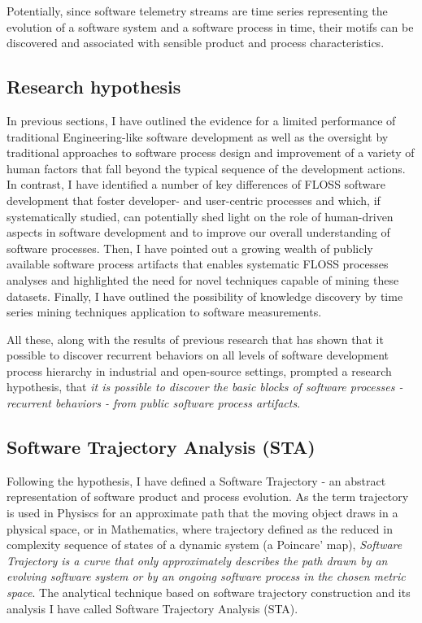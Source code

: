 Potentially, since software telemetry streams are time series representing the evolution of a software system 
and a software process in time, their motifs can be discovered and associated with sensible product and process characteristics.

%
%
\subsection{Research hypothesis}\label{section_research_hypothesis}
In previous sections, I have outlined the evidence for a limited performance of traditional Engineering-like 
software development as well as the oversight by traditional approaches to software process design and improvement
of a variety of human factors that fall beyond the typical sequence of the development actions.
In contrast, I have identified a number of key differences of FLOSS software development that 
foster developer- and user-centric processes and which, if systematically studied, can potentially shed light on 
the role of human-driven aspects in software development and to improve our overall understanding of 
software processes. 
Then, I have pointed out a growing wealth of publicly available software process artifacts that enables 
systematic FLOSS processes analyses and highlighted the need for novel techniques capable of mining these datasets.
Finally, I have outlined the possibility of knowledge discovery by time series mining techniques application 
to software measurements.

All these, along with the results of previous research that has shown that it possible to discover 
recurrent behaviors on all levels of software development process hierarchy \cite{citeulike:8347315} 
in industrial \cite{citeulike:5090131} and open-source \cite{citeulike:10377345} settings, 
prompted a research hypothesis, that \textit{it is possible to discover the basic blocks of software 
processes - recurrent behaviors - from public software process artifacts}. 

\subsection{Software Trajectory Analysis (STA)}
Following the hypothesis, I have defined a Software Trajectory - an abstract representation of software
product and process evolution. As the term trajectory is used in Physiscs for an approximate path that the 
moving object draws in a physical space, or in Mathematics, where trajectory defined as the reduced in 
complexity sequence of states of a dynamic system (a Poincare' map), \textit{Software Trajectory is a curve
that only approximately describes the path drawn by an evolving software system or by an ongoing software 
process in the chosen metric space}. The analytical technique based on software trajectory construction
and its analysis I have called Software Trajectory Analysis (STA).

